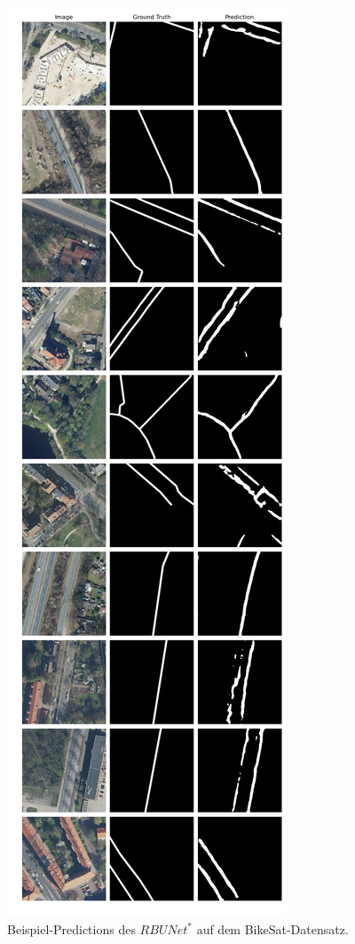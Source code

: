 \begin{figure}
	\centering
	\includegraphics[width=.41\textwidth]{Bilder/Samples-BikeSat/rbunet-s.png} 
	\caption{Beispiel-Predictions des $RBUNet^*$ auf dem BikeSat-Datensatz.}
	\label{fig:bikesat-samples-rbunet-s}
\end{figure}

